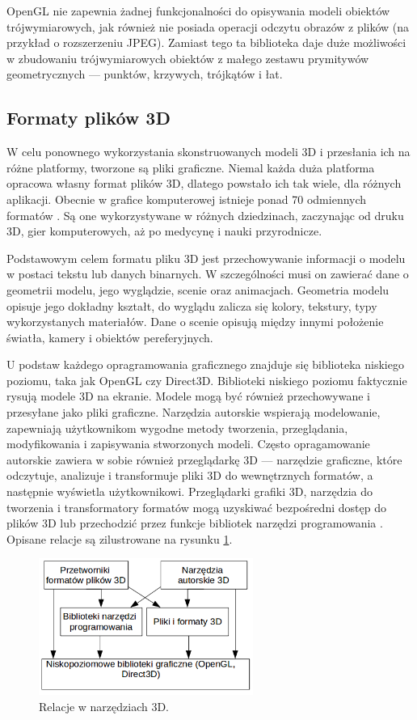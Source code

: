 OpenGL nie zapewnia żadnej funkcjonalności do opisywania modeli obiektów trójwymiarowych, jak również nie posiada operacji odczytu obrazów z plików (na przykład o rozszerzeniu JPEG). Zamiast tego ta biblioteka daje duże możliwości w zbudowaniu trójwymiarowych obiektów z małego zestawu prymitywów geometrycznych --- punktów, krzywych, trójkątów i łat.

\subsection{Formaty plików 3D}
W celu ponownego wykorzystania skonstruowanych modeli 3D i przesłania ich na różne platformy, tworzone są pliki graficzne. Niemal każda duża platforma opracowa własny format plików 3D, dlatego powstało ich tak wiele, dla różnych aplikacji. Obecnie w grafice komputerowej istnieje ponad 70 odmiennych formatów \cite{formatslist}. Są one wykorzystywane w różnych dziedzinach, zaczynając od druku 3D, gier komputerowych, aż po medycynę i nauki przyrodnicze. 

Podstawowym celem formatu pliku 3D jest przechowywanie informacji o modelu w postaci tekstu lub danych binarnych. W szczególności musi on zawierać dane o geometrii modelu, jego wyglądzie, scenie oraz animacjach. Geometria modelu opisuje jego dokładny kształt, do wyglądu zalicza się kolory, tekstury, typy wykorzystanych materiałów. Dane o scenie opisują między innymi położenie światła, kamery i obiektów pereferyjnych. 

U podstaw każdego opragramowania graficznego znajduje się biblioteka niskiego poziomu, taka jak OpenGL czy Direct3D. Biblioteki niskiego poziomu faktycznie rysują modele 3D na ekranie. Modele mogą być również przechowywane i przesyłane jako pliki graficzne. Narzędzia autorskie wspierają modelowanie, zapewniają użytkownikom wygodne metody tworzenia, przeglądania, modyfikowania i zapisywania stworzonych modeli. Często opragamowanie autorskie zawiera w sobie również przeglądarkę 3D --- narzędzie graficzne, które odczytuje, analizuje i transformuje pliki 3D do wewnętrznych formatów, a następnie wyświetla użytkownikowi. Przeglądarki grafiki 3D, narzędzia do tworzenia i transformatory formatów mogą uzyskiwać bezpośredni dostęp do plików 3D lub przechodzić przez funkcje bibliotek narzędzi programowania \cite{formatsinfo}. Opisane relacje są zilustrowane na rysunku \ref{rys5}.
\begin{figure}[H]
		\centering
 		\includegraphics[width=7.0cm]{relacje.png}
    	\caption{Relacje w narzędziach 3D.}
 		\label{rys5}
\end{figure}

